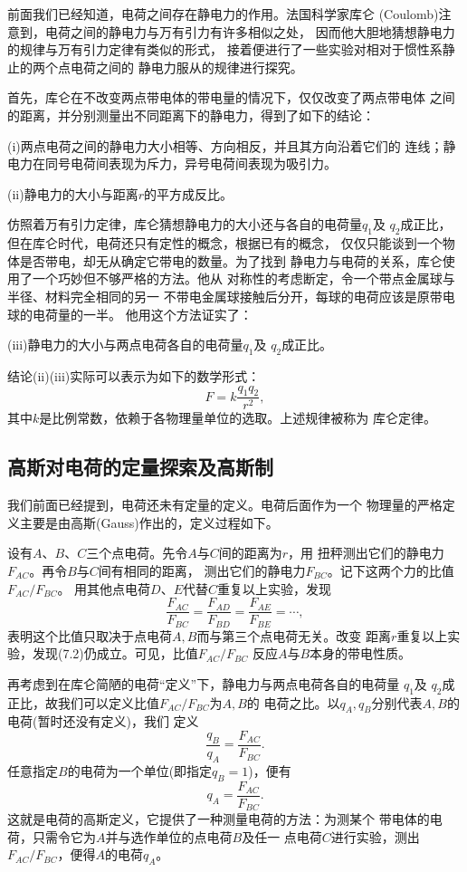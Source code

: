 前面我们已经知道，电荷之间存在静电力的作用。法国科学家库仑
(Coulomb)注意到，电荷之间的静电力与万有引力有许多相似之处，
因而他大胆地猜想静电力的规律与万有引力定律有类似的形式，
接着便进行了一些实验对相对于惯性系静止的两个点电荷之间的
静电力服从的规律进行探究。

首先，库仑在不改变两点带电体的带电量的情况下，仅仅改变了两点带电体
之间的距离，并分别测量出不同距离下的静电力，得到了如下的结论：

(i)两点电荷之间的静电力大小相等、方向相反，并且其方向沿着它们的
连线；静电力在同号电荷间表现为斥力，异号电荷间表现为吸引力。

(ii)静电力的大小与距离$r$的平方成反比。

仿照着万有引力定律，库仑猜想静电力的大小还与各自的电荷量$q_1$及 
$q_2$成正比，但在库仑时代，电荷还只有定性的概念，根据已有的概念，
仅仅只能谈到一个物体是否带电，却无从确定它带电的数量。为了找到
静电力与电荷的关系，库仑使用了一个巧妙但不够严格的方法。他从
对称性的考虑断定，令一个带点金属球与半径、材料完全相同的另一
不带电金属球接触后分开，每球的电荷应该是原带电球的电荷量的一半。
他用这个方法证实了：

(iii)静电力的大小与两点电荷各自的电荷量$q_1$及 $q_2$成正比。

结论(ii)(iii)实际可以表示为如下的数学形式： 
\begin{equation}
    F=k\frac{q_1q_2}{r^2},
\end{equation}
其中$k$是比例常数，依赖于各物理量单位的选取。上述规律被称为
库仑定律。
\subsection{高斯对电荷的定量探索及高斯制}
我们前面已经提到，电荷还未有定量的定义。电荷后面作为一个
物理量的严格定义主要是由高斯(Gauss)作出的，定义过程如下。

设有$A$、$B$、$C$三个点电荷。先令$A$与$C$间的距离为$r$，用 
扭秤测出它们的静电力$F_{AC}$。再令$B$与$C$间有相同的距离，
测出它们的静电力$F_{BC}$。记下这两个力的比值$F_{AC}/F_{BC}$。
用其他点电荷$D$、$E$代替$C$重复以上实验，发现
\begin{equation}
    \frac{F_{AC}}{F_{BC}}=\frac{F_{AD}}{F_{BD}}
    =\frac{F_{AE}}{F_{BE}}=\cdots ,
\end{equation}
表明这个比值只取决于点电荷$A,B$而与第三个点电荷无关。改变
距离$r$重复以上实验，发现(7.2)仍成立。可见，比值$F_{AC}/F_{BC}$
反应$A$与$B$本身的带电性质。

再考虑到在库仑简陋的电荷“定义”下，静电力与两点电荷各自的电荷量
$q_1$及 $q_2$成正比，故我们可以定义比值$F_{AC}/F_{BC}$为$A,B$的
电荷之比。以$q_A,q_B$分别代表$A,B$的电荷(暂时还没有定义)，我们 
定义 
\begin{equation}
    \frac{q_B}{q_A}=\frac{F_{AC}}{F_{BC}}.
\end{equation}
任意指定$B$的电荷为一个单位(即指定$q_B=1$)，便有
\begin{equation}
    q_A=\frac{F_{AC}}{F_{BC}}.
\end{equation}
这就是电荷的高斯定义，它提供了一种测量电荷的方法：为测某个
带电体的电荷，只需令它为$A$并与选作单位的点电荷$B$及任一
点电荷$C$进行实验，测出$F_{AC}/F_{BC}$，便得$A$的电荷$q_A$。

